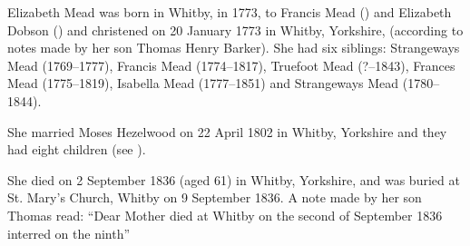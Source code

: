 
Elizabeth Mead was born in Whitby, in 1773, to Francis Mead () and Elizabeth Dobson () and christened on 20 January 1773 in Whitby, Yorkshire, (according to notes made by her son Thomas Henry Barker). She had six siblings: Strangeways Mead (1769--1777), Francis Mead (1774--1817), Truefoot Mead (?--1843), Frances Mead (1775--1819), Isabella Mead (1777--1851) and Strangeways Mead (1780--1844).

She married Moses Hezelwood on 22 April 1802 in	Whitby, Yorkshire \cite{MHezelwoodMarriage} and they had eight children (see ).

She died on 2 September 1836 (aged 61) in Whitby, Yorkshire, and was buried at St. Mary's Church, Whitby on 9 September 1836. \cite{EMeadDeath} A note made by her son Thomas read: ``Dear Mother died at Whitby on the second of September 1836 interred on the ninth''
